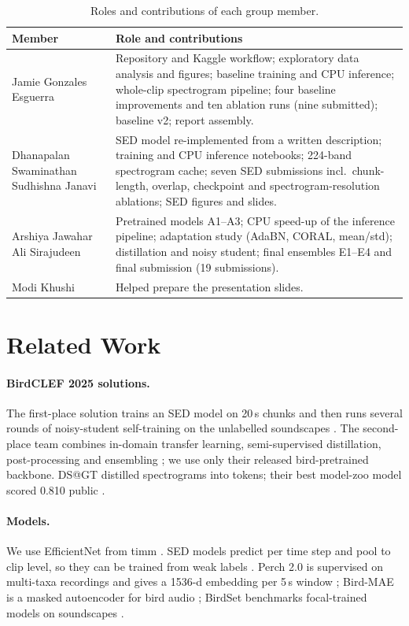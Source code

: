 \documentclass[letterpaper]{article} %
\begin{document}
\begin{table}[t]
\centering
\small
\begin{tabular}{p{}p{}}
\toprule
Member & Role and contributions \\
\midrule
Jamie Gonzales Esguerra & Repository and Kaggle workflow; exploratory data analysis and figures; baseline training and CPU inference; whole-clip spectrogram pipeline; four baseline improvements and ten ablation runs (nine submitted); baseline v2; report assembly. \\
Dhanapalan Swaminathan Sudhishna Janavi & SED model re-implemented from a written description; training and CPU inference notebooks; 224-band spectrogram cache; seven SED submissions incl.\ chunk-length, overlap, checkpoint and spectrogram-resolution ablations; SED figures and slides. \\
Arshiya Jawahar Ali Sirajudeen & Pretrained models A1--A3; CPU speed-up of the inference pipeline; adaptation study (AdaBN, CORAL, mean/std); distillation and noisy student; final ensembles E1--E4 and final submission (19 submissions). \\
Modi Khushi & Helped prepare the presentation slides. \\
\bottomrule
\end{tabular}
\caption{Roles and contributions of each group member.}
\label{tab:roles}
\end{table}

\section{Related Work}
\paragraph{BirdCLEF 2025 solutions.} The first-place solution trains an SED model on 20\,s chunks and then runs several rounds of noisy-student self-training on the unlabelled soundscapes \citep{babych2025first}. The second-place team combines in-domain transfer learning, semi-supervised distillation, post-processing and ensembling \citep{sydorskyi2025tackling}; we use only their released bird-pretrained backbone. DS@GT distilled spectrograms into tokens; their best model-zoo model scored 0.810 public \citep{miyaguchi2025distilling}.

\paragraph{Models.} We use EfficientNet \citep{tan2019efficientnet,tan2021efficientnetv2} from timm \citep{wightman2019timm}. SED models predict per time step and pool to clip level, so they can be trained from weak labels \citep{mesaros2021sound,kong2020panns}. Perch 2.0 is supervised on multi-taxa recordings and gives a 1536-d embedding per 5\,s window \citep{vanmerrienboer2025perch}; Bird-MAE is a masked autoencoder for bird audio \citep{rauch2025can}; BirdSet benchmarks focal-trained models on soundscapes \citep{rauch2025birdset}.
\end{document}
